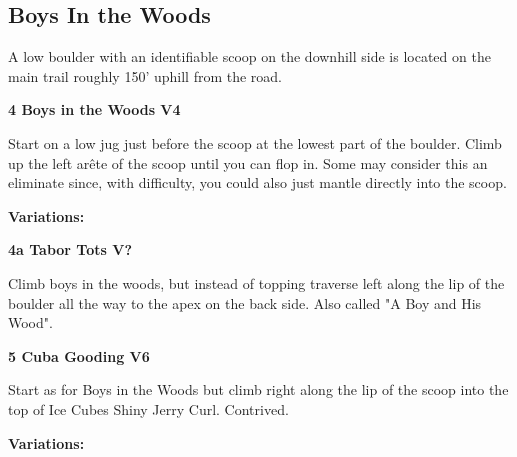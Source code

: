 	\raggedcolumns
	\begin{multicols}{2}


\needspace{1.5cm}
\subsection*{Boys In the Woods}\label{bf:Boys In the Woods}
A low boulder with an identifiable scoop on the downhill side is located on the main trail roughly 150' uphill from the road.\\
	


\needspace{1.5cm}
\label{rt:Boys in the Woods}
\colorbox{RoyalBlue!20}{
\parbox{0.95\linewidth}{
\textbf{
4 Boys in the Woods V4  
}}}

\begin{adjustwidth}{0.5cm}{}			
Start on a low jug just before the scoop at the lowest part of the boulder. Climb up the left arête of the scoop until you can flop in. Some may consider this an eliminate since, with difficulty, you could also just mantle directly into the scoop.
\end{adjustwidth}

\begin{adjustwidth}{0.5cm}{}				
\needspace{3cm}
\textbf{Variations:} \newline

\needspace{1.5cm}
\label{vr:Tabor Tots}
\colorbox{black!20}{
\parbox{0.95\linewidth}{
\textbf{
4a Tabor Tots V?  
}}}

\begin{adjustwidth}{0.5cm}{}			
Climb boys in the woods, but instead of topping traverse left along the lip of the boulder all the way to the apex on the back side. Also called "A Boy and His Wood".
\end{adjustwidth}


\end{adjustwidth}


\needspace{1.5cm}
\label{rt:Cuba Gooding}
\colorbox{RoyalBlue!20}{
\parbox{0.95\linewidth}{
\textbf{
5 Cuba Gooding V6  
}}}

\begin{adjustwidth}{0.5cm}{}			
Start as for Boys in the Woods but climb right along the lip of the scoop into the top of Ice Cubes Shiny Jerry Curl. Contrived.
\end{adjustwidth}

\begin{adjustwidth}{0.5cm}{}				
\needspace{3cm}
\textbf{Variations:} \newline


\end{adjustwidth}
\end{multicols}
